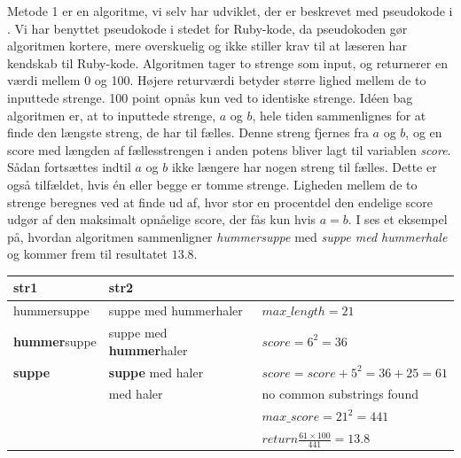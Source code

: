Metode 1 er en algoritme, vi selv har udviklet, der er beskrevet med pseudokode i . Vi har benyttet pseudokode i stedet for Ruby-kode, da pseudokoden gør algoritmen kortere, mere overskuelig og ikke stiller krav til at læseren har kendskab til Ruby-kode. Algoritmen tager to strenge som input, og returnerer en værdi mellem 0 og 100. Højere returværdi betyder større lighed mellem de to inputtede strenge. 100 point opnås kun ved to identiske strenge. Idéen bag algoritmen er, at to inputtede strenge, $a$ og $b$, hele tiden sammenlignes for at finde den længste streng, de har til fælles. Denne streng fjernes fra $a$ og $b$, og en score med længden af fællesstrengen i anden potens bliver lagt til variablen \textit{score}. Sådan fortsættes indtil $a$ og $b$ ikke længere har nogen streng til fælles. Dette er også tilfældet, hvis én eller begge er tomme strenge. Ligheden mellem de to strenge beregnes ved at finde ud af, hvor stor en procentdel den endelige score udgør af den maksimalt opnåelige score, der fås kun hvis $a = b$.
I  ses et eksempel på, hvordan algoritmen sammenligner \textit{hummersuppe} med \textit{suppe med hummerhale} og kommer frem til resultatet $13.8$.

\begin{table}
  \center
    \begin{tabular}{|l|l|l|}
        \hline
        str1        & str2                  & ~                             \\ \hline
hummersuppe & suppe med hummerhaler & $max\_length = 21$               \\         
        \textbf{hummer}suppe & suppe med \textbf{hummer}haler & $score = 6^2 = 36$               \\ 
        \textbf{suppe}       & \textbf{suppe} med haler       & $score = score + 5^2 = 36 + 25 = 61$                 \\ 
        ~           &  med haler            & no common substrings found        \\ 
        ~           & ~                     & $max\_score = 21^2  = 441$    \\ 
        ~           & ~                     & $return \frac{61 \times 100}{441} = 13.8$ \\
        \hline
    \end{tabular}
    \label{table:vores-compare-eksempel}
\end{table}

